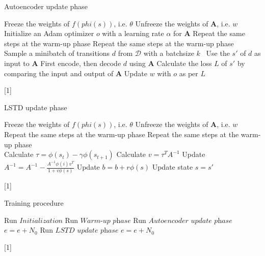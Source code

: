 \documentclass[a4paper,12pt,oneside]{article}
\numberwithin{equation}{section}
\begin{document}
    \clearpage
    \begin{algorithm}
    \caption{Autoencoder update phase}
        \begin{algorithmic}[1]
        \State Freeze the weights of \(f(phi(s))\), i.e. $\theta$
        \State Unfreeze the weights of $\mathbf{A}$, i.e. \(w\)
        \State Initialize an Adam optimizer \(o\) with a learning rate $\alpha$ for $\mathbf{A}$
            \State Repeat the same steps at the warm-up phase
                \State Repeat the same steps at the warm-up phase
                \\
                \State Sample a minibatch of transitions \(d\) from $\mathcal{D}$ with a batchsize \(k\) \
                \State Use the \(s'\) of \(d\) as input to $\mathbf{A}$
                \State First encode, then decode \(d\) using $\mathbf{A}$
                \State Calculate the loss \(L\) of \(s'\) by comparing the input and output of $\mathbf{A}$
                \State Update \(w\) with \(o\) as per \(L\)
            \EndFor
        \EndFor
        \end{algorithmic}[1]
    \end{algorithm}

    \clearpage
    \begin{algorithm}
    \caption{LSTD update phase}
        \begin{algorithmic}[1]
            \State Freeze the weights of \(f(phi(s))\), i.e. $\theta$
            \State Unfreeze the weights of $\mathbf{A}$, i.e. \(w\)
        \For {\(episode\) \(e = 1\) to \(N_0\)}
            \State Repeat the same steps at the warm-up phase
                \State Repeat the same steps at the warm-up phase
                \\
                \State Calculate $\tau = \phi(s_t) - \gamma \phi(s_{t+1})$
                \State Calculate $v = \tau^{T} A^{-1}$
                \State Update $A^{-1} = A^{-1} - \frac{A^{-1} \phi(i) v^{T}}{1 + v \phi(s)}$
                \State Update $b = b + r \phi(s)$
                \State Update state $s=s'$
            \EndFor
        \EndFor
        \end{algorithmic}[1]    
    \end{algorithm}


    \clearpage
    \begin{algorithm}
        \caption{Training procedure}
        \begin{algorithmic}[1]
        \State Run \(Initialization\)
        \State Run \(\textit{Warm-up phase}\)
            \State Run \(\textit{Autoencoder update phase}\)
            \State $e=e+N_0$
            \State Run \(\textit{LSTD update phase}\)
            \State $e=e+N_0$
        \EndWhile
        \end{algorithmic}[1]    
    \end{algorithm}
    
    
\end{document}
